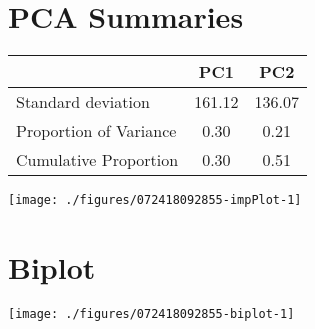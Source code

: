 \documentclass[a4paper,11pt]{article}\usepackage[]{graphicx}\usepackage[]{color}
\makeatletter
\def\maxwidth{ %
  \ifdim\Gin@nat@width>\linewidth
    \linewidth
  \else
    \Gin@nat@width
  \fi
}
\newenvironment{knitrout}{}{} %
\makeatother
\begin{document}
\clearpage
\section{PCA Summaries}

\begin{table}[ht]
\begin{flushleft}
\begin{tabular}{lcc}
  \hline
 & PC1 & PC2 \\ 
  \hline
Standard deviation & 161.12 & 136.07 \\ 
  Proportion of Variance & 0.30 & 0.21 \\ 
  Cumulative Proportion & 0.30 & 0.51 \\ 
   \hline
\end{tabular}
\label{importance}
\end{flushleft}
\end{table}


\begin{knitrout}
\color{fgcolor}

\texttt{[image: ./figures/072418092855-impPlot-1]} \hfill{}



\end{knitrout}
\newpage

\section{Biplot}
\begin{knitrout}
\color{fgcolor}
\texttt{[image: ./figures/072418092855-biplot-1]} 

\end{knitrout}

\end{document}
